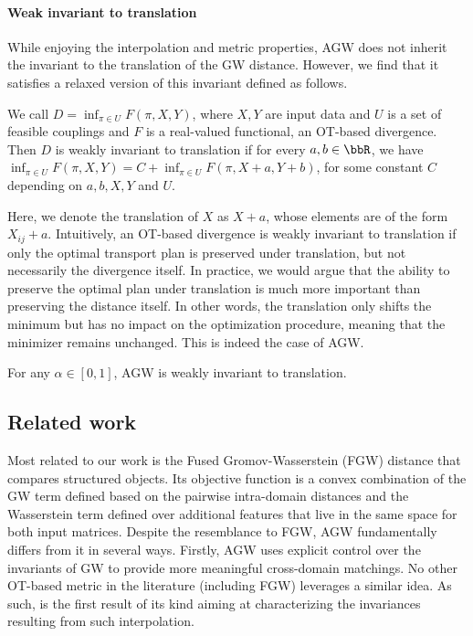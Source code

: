 \paragraph{Weak invariant to translation}
While enjoying the interpolation and metric properties, AGW does not inherit the invariant
to the translation of the GW distance. However, we find that it satisfies a relaxed version
of this invariant defined as follows.
\begin{definition}
    We call $D = \inf_{\pi \in U} F(\pi, X, Y)$, where $X, Y$ are input data and $U$
    is a set of feasible couplings and $F$ is a real-valued functional, an OT-based divergence.
    Then $D$ is weakly invariant to translation if for every $a, b \in \bbR$, we have
    $\inf_{\pi \in U} F(\pi, X, Y) = C + \inf_{\pi \in U} F(\pi, X + a, Y+b)$,
    for some constant $C$ depending on $a, b, X, Y$ and $U$.
\end{definition}
Here, we denote the translation of $X$ as $X + a$, whose elements are of the form $X_{ij} + a$.
Intuitively, an OT-based divergence is weakly invariant to translation if only
the optimal transport plan is preserved under translation, but not necessarily the divergence itself.
In practice, we would argue that the ability to preserve the optimal plan under translation
is much more important than preserving the distance itself. In other words,
the translation only shifts the minimum but has no impact on the optimization procedure,
meaning that the minimizer remains unchanged. This is indeed the case of AGW.
\begin{proposition}
    \label{prop:invariant} For any $\alpha \in [0,1]$, AGW is weakly invariant to translation.
\end{proposition}

\subsection{Related work}

Most related to our work is the Fused Gromov-Wasserstein (FGW) distance \citep{Vayer19b}
that compares structured objects. Its objective function is a convex combination of
the GW term defined based on the pairwise intra-domain distances and the Wasserstein term
defined over additional features that live in the same space for both input matrices.
Despite the resemblance to FGW, AGW fundamentally differs from it in several ways.
Firstly, AGW uses explicit control over the invariants of GW to provide more meaningful
cross-domain matchings. No other OT-based metric in the literature (including FGW)
leverages a similar idea. As such,  is the first result of its kind
aiming at characterizing the invariances resulting from such interpolation.

